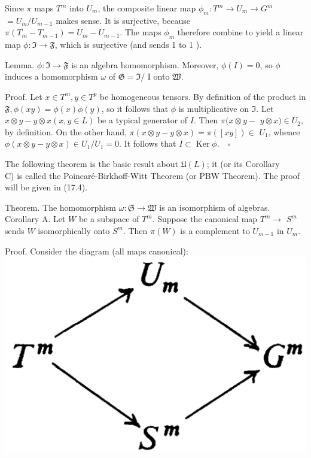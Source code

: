 \documentclass[10pt]{article}
\begin{document}
Since $\pi$ maps $T^{m}$ into $U_{m}$, the composite linear map $\phi_{m}: T^{m} \rightarrow U_{m} \rightarrow G^{m}$ $=U_{m} / U_{m-1}$ makes sense. It is surjective, because $\pi\left(T_{m}-T_{m-1}\right)=U_{m}-U_{m-1}$. The maps $\phi_{m}$ therefore combine to yield a linear map $\phi: \mathfrak{I} \rightarrow \mathfrak{F}$, which is surjective (and sends 1 to 1 ).

Lemma. $\phi: \mathfrak{I} \rightarrow \mathfrak{F}$ is an algebra homomorphism. Moreover, $\phi(I)=0$, so $\phi$ induces a homomorphism $\omega$ of $\mathfrak{G}=\mathfrak{I} /$ I onto $\mathfrak{W}$.

Proof. Let $x \in T^{m}, y \in T^{p}$ be homogeneous tensors. By definition of the product in $\mathfrak{F}, \phi(x y)=\phi(x) \phi(y)$, so it follows that $\phi$ is multiplicative on $\mathfrak{I}$. Let $x \otimes y-y \otimes x(x, y \in L)$ be a typical generator of $I$. Then $\pi(x \otimes y-$ $y \otimes x) \in U_{2}$, by definition. On the other hand, $\pi(x \otimes y-y \otimes x)=\pi([x y]) \in$ $U_{1}$, whence $\phi(x \otimes y-y \otimes x) \in U_{1} / U_{1}=0$. It follows that $I \subset \operatorname{Ker} \phi . \quad \square$

The following theorem is the basic result about $\mathfrak{U}(L)$; it (or its Corollary\\
C) is called the Poincaré-Birkhoff-Witt Theorem (or PBW Theorem). The proof will be given in (17.4).

Theorem. The homomorphism $\omega: \mathfrak{S} \rightarrow \mathfrak{W}$ is an isomorphism of algebras.\\
Corollary A. Let $W$ be a subspace of $T^{m}$. Suppose the canonical map $T^{m} \rightarrow$ $S^{m}$ sends $W$ isomorphically onto $S^{m}$. Then $\pi(W)$ is a complement to $U_{m-1}$ in $U_{m}$.

Proof. Consider the diagram (all maps canonical):\\
\includegraphics[max width=\textwidth, center]{2025_06_06_fac2836a92464059da43g-105}
\end{document}
